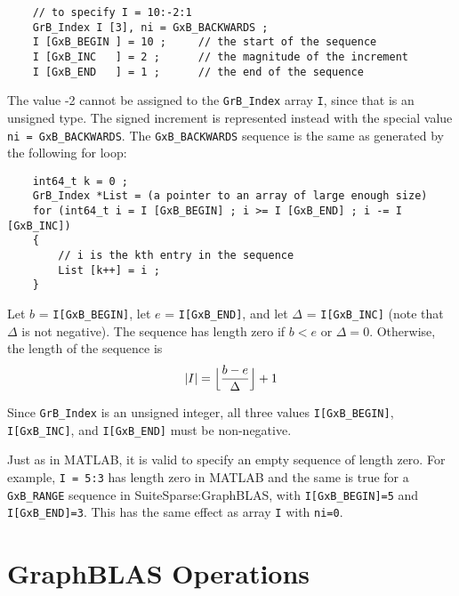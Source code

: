 \documentclass[12pt]{article}
\begin{document}
\begin{enumerate}
    \vspace{-0.1in}
    {\footnotesize
    \begin{verbatim}
    // to specify I = 10:-2:1
    GrB_Index I [3], ni = GxB_BACKWARDS ;
    I [GxB_BEGIN ] = 10 ;     // the start of the sequence
    I [GxB_INC   ] = 2 ;      // the magnitude of the increment
    I [GxB_END   ] = 1 ;      // the end of the sequence \end{verbatim}}

    \vspace{-0.1in}
    The value -2 cannot be assigned to the \verb'GrB_Index' array \verb'I',
    since that is an unsigned type.  The signed increment is represented
    instead with the special value \verb'ni = GxB_BACKWARDS'.
    The \verb'GxB_BACKWARDS' sequence is the same as generated by the following
    for loop:

    \vspace{-0.1in}
    {\footnotesize
    \begin{verbatim}
    int64_t k = 0 ;
    GrB_Index *List = (a pointer to an array of large enough size)
    for (int64_t i = I [GxB_BEGIN] ; i >= I [GxB_END] ; i -= I [GxB_INC])
    {
        // i is the kth entry in the sequence
        List [k++] = i ;
    } \end{verbatim}}

    \vspace{-0.1in}
    Let $b$ = \verb'I[GxB_BEGIN]', let $e$ = \verb'I[GxB_END]', and let
    $\Delta$ = \verb'I[GxB_INC]' (note that $\Delta$ is not negative).  The
    sequence has length zero if $b < e$ or $\Delta=0$.  Otherwise, the length
    of the sequence is
    \[
    |I| = \Bigl\lfloor\dfrac{b-e}{\Delta}\Bigr\rfloor + 1
    \]

\end{enumerate}

Since \verb'GrB_Index' is an unsigned integer, all three values
\verb'I[GxB_BEGIN]', \verb'I[GxB_INC]', and \verb'I[GxB_END]' must
be non-negative.

Just as in MATLAB, it is valid to specify an empty sequence of length zero.
For example, \verb'I = 5:3' has length zero in MATLAB and the same is
true for a \verb'GxB_RANGE' sequence in SuiteSparse:GraphBLAS, with
\verb'I[GxB_BEGIN]=5' and \verb'I[GxB_END]=3'.  This has the same
effect as array \verb'I' with \verb'ni=0'.

\newpage
\section{GraphBLAS Operations} %
\label{operations}
\end{document}
